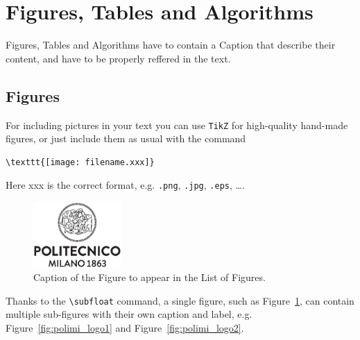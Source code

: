 \documentclass{config/PoliMi3i_thesis}
\begin{document}
\section{Figures, Tables and Algorithms}
Figures, Tables and Algorithms have to contain a Caption that describe their content, and have to be properly reffered in the text.

\subsection{Figures}
\label{subsec:figures}

For including pictures in your text you can use \texttt{TikZ} for high-quality hand-made figures,
or just include them as usual with the command
\begin{verbatim}
\texttt{[image: filename.xxx]}
\end{verbatim}
Here xxx is the correct format, e.g. \verb|.png|, \verb|.jpg|, \verb|.eps|, \dots.

\begin{figure}[H]
    \centering
    \includegraphics[width=0.3\textwidth]{logo_polimi_scritta.eps}
    \caption{Caption of the Figure to appear in the List of Figures.}
    \label{fig:quadtree}
\end{figure}

Thanks to the \texttt{\textbackslash subfloat} command, a single figure, such as Figure~\ref{fig:quadtree},
can contain multiple sub-figures with their own caption and label, e.g. \color{black} Figure~\ref{fig:polimi_logo1} and Figure~\ref{fig:polimi_logo2}.
\end{document}

